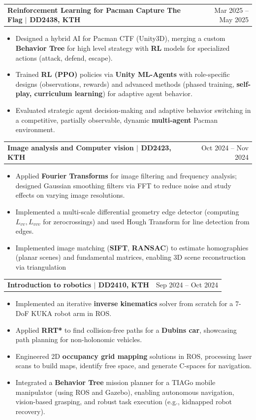 \documentclass[letterpaper, 11pt]{article}
\makeatletter
\newcommand{\resumeItem}[1]{ \item\small{ {#1 \vspace{-2pt}} } }
\newcommand{\resumeProjectHeading}[2]{
\vspace{-1pt}
\item
\begin{tabular*}{1.0\textwidth}[t]{l@{\extracolsep{\fill}}r}
	\textbf{#1}  & {\small #2} \\
\end{tabular*}
\vspace{-20pt}
}
\newcommand{\resumeItemListStart}{\begin{itemize}[leftmargin=0.25in]}
\newcommand{\resumeItemListEnd}{\end{itemize}
\vspace{-5pt}}
\makeatother
\begin{document}
    \resumeProjectHeading{Reinforcement Learning for Pacman Capture The Flag $|$ \textnormal{\small DD2438, KTH}}{Mar 2025 -- May 2025}
    \resumeItemListStart 
        \resumeItem{Designed a hybrid AI for Pacman CTF (Unity3D), merging a custom \textbf{Behavior Tree} for high level strategy with \textbf{RL} models for specialized actions (attack, defend, escape).}
        \resumeItem{Trained \textbf{RL (PPO)} policies via \textbf{Unity ML-Agents} with role-specific designs (observations, rewards) and advanced methods (phased training, \textbf{self-play, curriculum learning}) for adaptive agent behavior.}
        \resumeItem{Evaluated strategic agent decision-making and adaptive behavior switching in a competitive, partially observable, dynamic \textbf{multi-agent} Pacman environment.}
    \resumeItemListEnd

    \resumeProjectHeading{Image analysis and Computer vision $|$ \textnormal{\small DD2423, KTH}}{Oct 2024 -- Nov 2024}
    \resumeItemListStart 
        \resumeItem{Applied \textbf{Fourier Transforms} for image filtering and frequency analysis; designed Gaussian smoothing filters via FFT to reduce noise and study effects on varying image resolutions.}
        \resumeItem{Implemented a multi-scale differential geometry edge detector (computing $L_{vv}, L_{vvv}$ for zero\-crossings)
        and used Hough Transform for line detection from edges.}
        \resumeItem{Implemented image matching (\textbf{SIFT}, \textbf{RANSAC}) to estimate homographies (planar scenes) and fundamental matrices, enabling 3D scene reconstruction via triangulation}
    \resumeItemListEnd

    \resumeProjectHeading{Introduction to robotics $|$ \textnormal{\small DD2410, KTH}}{Sep 2024 -- Oct 2024}
    \resumeItemListStart 
        \resumeItem{Implemented an iterative \textbf{inverse kinematics} solver from scratch for a 7-DoF KUKA robot arm in ROS.}
        \resumeItem{Applied \textbf{RRT*} to find collision-free paths for a \textbf{Dubins car}, showcasing path planning for non-holonomic vehicles.}
        \resumeItem{Engineered 2D \textbf{occupancy grid mapping} solutions in ROS, processing laser scans to build maps, identify free space, and generate C-spaces for navigation.}
        \resumeItem{Integrated a \textbf{Behavior Tree} mission planner for a TIAGo mobile manipulator (using ROS and Gazebo), enabling autonomous navigation, vision-based grasping, and robust task execution (e.g., kidnapped robot recovery).}
    \resumeItemListEnd
    
\end{document}

